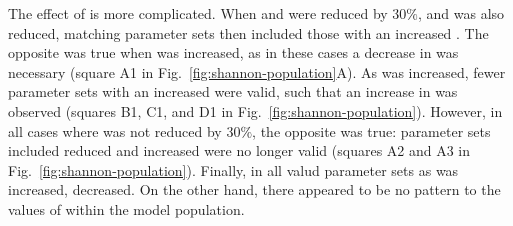 \documentclass[../thesis-main.tex]{subfiles}
\begin{document}
The effect of \gto{} is more complicated. When \gca{} and \gkix{} were reduced by $30\%$, and \gnak{} was also reduced, matching parameter sets then included those with an increased \gto{}. The opposite was true when \gnak{} was increased, as in these cases a decrease in \gto{} was necessary (square A1 in Fig.~\ref{fig:shannon-population}A). As \gkix{} was increased, fewer parameter sets with an increased \gnak{} were valid, such that an increase in \gto{} was observed (squares B1, C1, and D1 in Fig.~\ref{fig:shannon-population}). However, in all cases where \gca{} was not reduced by $30\%$, the opposite was true: parameter sets included reduced \gnak{} and increased \gto{} were no longer valid (squares A2 and A3 in Fig.~\ref{fig:shannon-population}). Finally, in all valud parameter sets as \gkix{} was increased, \gto{} decreased. On the other hand, there appeared to be no pattern to the values of \gks{} within the model population.
\end{document}
